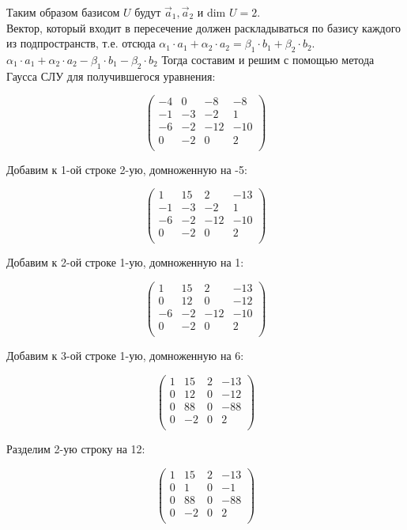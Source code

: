 	Таким образом базисом $U$ будут $\vec a_1, \vec a_2$ и dim $U = 2$. \\
	
	Вектор, который входит в пересечение должен раскладываться по базису каждого из подпространств, т.е. отсюда $\alpha_1 \cdot a_1 + \alpha_2 \cdot a_2 = \beta_1 \cdot b_1 + \beta_2 \cdot b_2$. $\alpha_1 \cdot a_1 + \alpha_2 \cdot a_2 - \beta_1 \cdot b_1 - \beta_2 \cdot b_2$
	Тогда составим и решим с помощью метода Гаусса СЛУ для получившегося уравнения: 
	
	\[
	\begin{pmatrix}
	-4 & 0 & -8 & -8 \\
	-1 & -3 & -2 & 1 \\
	-6 & -2 & -12 & -10 \\
	0 & -2 & 0 & 2 \\
	\end{pmatrix}
	\]
	
	Добавим к 1-ой строке 2-ую, домноженную на -5:
	
	\[
	\begin{pmatrix}
	1 & 15 & 2 & -13 \\
	-1 & -3 & -2 & 1 \\
	-6 & -2 & -12 & -10 \\
	0 & -2 & 0 & 2 \\
	\end{pmatrix}
	\]
	
	Добавим к 2-ой строке 1-ую, домноженную на 1:
	
	\[
	\begin{pmatrix}
	1 & 15 & 2 & -13 \\
	0 & 12 & 0 & -12 \\
	-6 & -2 & -12 & -10 \\
	0 & -2 & 0 & 2 \\
	\end{pmatrix}
	\]
	
	Добавим к 3-ой строке 1-ую, домноженную на 6:
	
	\[
	\begin{pmatrix}
	1 & 15 & 2 & -13 \\
	0 & 12 & 0 & -12 \\
	0 & 88 & 0 & -88 \\
	0 & -2 & 0 & 2 \\
	\end{pmatrix}
	\]
	
	Разделим 2-ую строку на 12:
	
	\[
	\begin{pmatrix}
	1 & 15 & 2 & -13 \\
	0 & 1 & 0 & -1 \\
	0 & 88 & 0 & -88 \\
	0 & -2 & 0 & 2 \\
	\end{pmatrix}
	\]
	
